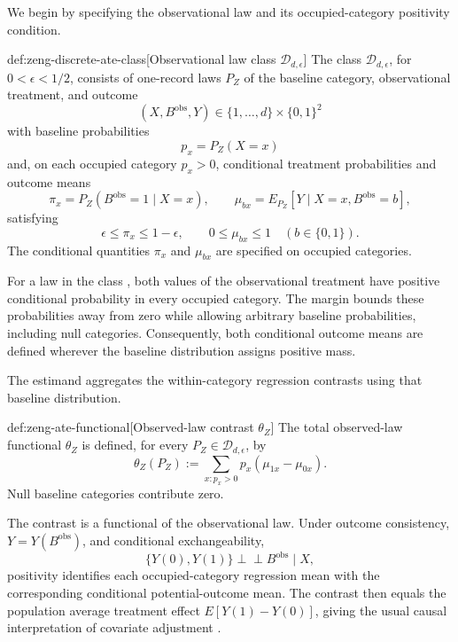 \documentclass[11pt]{article}
\begin{document}
We begin by specifying the observational law and its occupied-category positivity condition.
\begin{definitionv}{def:zeng-discrete-ate-class}[Observational law class \(\mathcal D_{d,\epsilon}\)]
The class \(\mathcal D_{d,\epsilon}\), for \(0<\epsilon<1/2\), consists of one-record laws \(P_Z\) of the baseline category, observational treatment, and outcome
\[
(X,B^{\mathrm{obs}},Y)\in\{1,\ldots,d\}\times\{0,1\}^2
\]
with baseline probabilities
\[
p_x=P_Z(X=x)
\]
and, on each occupied category \(p_x>0\), conditional treatment probabilities and outcome means
\[
\pi_x=P_Z(B^{\mathrm{obs}}=1\mid X=x),
\qquad
\mu_{bx}=E_{P_Z}[Y\mid X=x,B^{\mathrm{obs}}=b],
\]
satisfying
\[
\epsilon\le\pi_x\le1-\epsilon,
\qquad
0\le\mu_{bx}\le1
\quad (b\in\{0,1\}).
\]
The conditional quantities \(\pi_x\) and \(\mu_{bx}\) are specified on occupied categories.
\end{definitionv}

For a law  in the class , both values of the observational treatment  have positive conditional probability in every occupied category. The margin bounds these probabilities away from zero while allowing arbitrary baseline probabilities, including null categories. Consequently, both conditional outcome means are defined wherever the baseline distribution assigns positive mass.

The estimand aggregates the within-category regression contrasts using that baseline distribution.
\begin{definitionv}{def:zeng-ate-functional}[Observed-law contrast $\theta_Z$]
The total observed-law functional \(\theta_Z\) is defined, for every \(P_Z\in\mathcal D_{d,\epsilon}\), by
\[
\theta_Z(P_Z)
:=
\sum_{x:p_x>0}p_x(\mu_{1x}-\mu_{0x}).
\]
Null baseline categories contribute zero.
\end{definitionv}

The contrast  is a functional of the observational law. Under outcome consistency, \(Y=Y(B^{\mathrm{obs}})\), and conditional exchangeability,
\[
\{Y(0),Y(1)\}\perp\!\!\!\perp B^{\mathrm{obs}}\mid X,
\]
positivity identifies each occupied-category regression mean with the corresponding conditional potential-outcome mean. The contrast then equals the population average treatment effect \(E[Y(1)-Y(0)]\), giving the usual causal interpretation of covariate adjustment \citep{Rosenbaum1983}.
\end{document}
